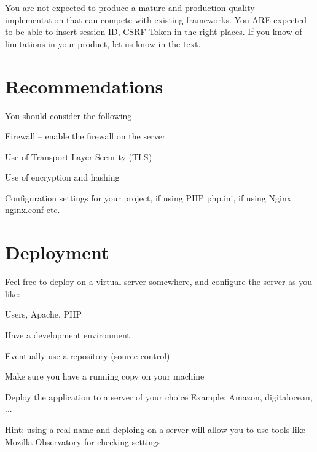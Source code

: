 \documentclass[a4paper,11pt,notitlepage]{report}
\begin{document}
You are not expected to produce a mature and production quality implementation that can compete with existing frameworks. You ARE expected to be able to insert session ID, CSRF Token in the right places. If you know of limitations in your product, let us know in the text.

\section*{Recommendations}

You should consider the following
\begin{list2}
\item Firewall -- enable the firewall on the server
\item Use of Transport Layer Security (TLS)
\item Use of encryption and hashing
\item Configuration settings for your project, if using PHP php.ini, if using Nginx nginx.conf etc.
\end{list2}


\section*{Deployment}

Feel free to deploy on a virtual server somewhere, and configure the server as you like:
\begin{list2}
\item Users, Apache, PHP
\item Have a development environment
\item Eventually use a repository (source control)
\item Make sure you have a running copy on your machine
\end{list2}

Deploy the application to a server of your choice Example: Amazon, digitalocean, ...

Hint: using a real name and deploing on a server will allow you to use tools like Mozilla Observatory for checking settings 
\end{document}
